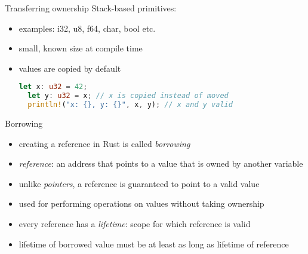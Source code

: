 \documentclass{beamer}
\begin{document}
\begin{frame}[fragile]{Transferring ownership}
Stack-based primitives: 
\begin{itemize}
  \item examples: i32, u8, f64, char, bool etc.
  \item small, known size at compile time
  \item values are copied by default

  \begin{lstlisting}[language=Rust]
  let x: u32 = 42;
  let y: u32 = x; // x is copied instead of moved
  println!("x: {}, y: {}", x, y); // x and y valid
  \end{lstlisting}
\end{itemize}
\end{frame}


\begin{frame}[fragile]{Borrowing}
\begin{itemize}
  \item creating a reference in Rust is called \emph{borrowing}
  \item \emph{reference}: an address that points to a value that is owned by another variable
  \item unlike \emph{pointers}, a reference is guaranteed to point to a valid value
  \item used for performing operations on values without taking ownership
  \item every reference has a \emph{lifetime}: scope for which reference is valid
  \item lifetime of borrowed value must be at least as long as lifetime of reference
\end{itemize}
\end{frame}


\end{document}
